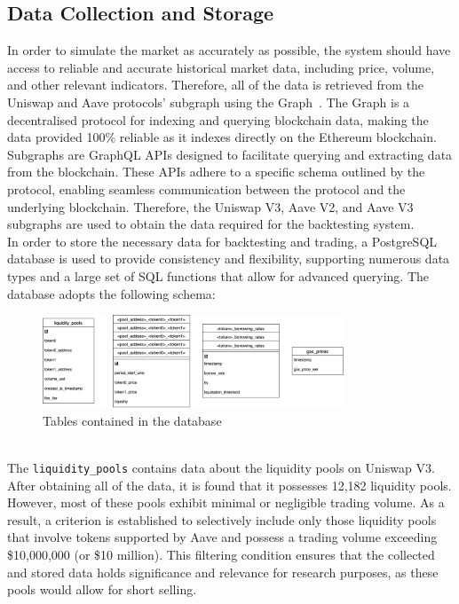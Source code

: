 \subsection{Data Collection and Storage}
In order to simulate the market as accurately as possible, the system should have access to reliable and accurate historical market data, including price, volume, and other relevant indicators. Therefore, all of the data is retrieved from the Uniswap and Aave protocols' subgraph using the Graph~\cite{noauthor_graph_nodate}. The Graph is a decentralised protocol for indexing and querying blockchain data, making the data provided 100\% reliable as it indexes directly on the Ethereum blockchain. Subgraphs are GraphQL APIs designed to facilitate querying and extracting data from the blockchain. These APIs adhere to a specific schema outlined by the protocol, enabling seamless communication between the protocol and the underlying blockchain. Therefore, the Uniswap V3, Aave V2, and Aave V3 subgraphs are used to obtain the data required for the backtesting system.
\\[3mm]
In order to store the necessary data for backtesting and trading, a PostgreSQL database is used to provide consistency and flexibility, supporting numerous data types and a large set of SQL functions that allow for advanced querying. The database adopts the following schema:
\begin{figure}[!htb]
    \centering
    \includegraphics[width=0.8\textwidth]{project/Images/database_tables.png}
    \caption{Tables contained in the database \label{fig:database}}
\end{figure}
\\[3mm]
The \texttt{liquidity\_pools} contains data about the liquidity pools on Uniswap V3. After obtaining all of the data, it is found that it possesses 12,182 liquidity pools. However, most of these pools exhibit minimal or negligible trading volume. As a result, a criterion is established to selectively include only those liquidity pools that involve tokens supported by Aave and possess a trading volume exceeding \$10,000,000 (or \$10 million). This filtering condition ensures that the collected and stored data holds significance and relevance for research purposes, as these pools would allow for short selling.
